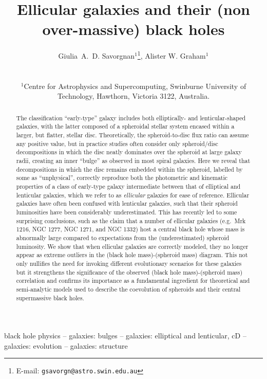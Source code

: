 \documentclass[useAMS,usenatbib,article]{mn2e}
\title[Ellicular galaxies]{Ellicular galaxies and their (non over-massive) black holes}
\author[G.~A.~D. Savorgnan \& A.~W. Graham]
{\parbox{\textwidth}{
Giulia~A.~D. Savorgnan$^{1}$\thanks{E-mail: \texttt{gsavorgn@astro.swin.edu.au}},
Alister W. Graham$^{1}$}\vspace{0.4cm}\\
\parbox{\textwidth}{
$^{1}$Centre for Astrophysics and Supercomputing, Swinburne University of Technology, Hawthorn, Victoria 3122, Australia.\\}}
\begin{document}
\maketitle

\label{firstpage}



\begin{abstract}
The classification ``early-type'' galaxy includes both elliptically- and lenticular-shaped galaxies, 
with the latter composed of a spheroidal stellar system encased within a larger, but flatter, stellar disc. 
Theoretically, the spheroid-to-disc flux ratio can assume any positive value,  
but in practice studies often consider only spheroid/disc decompositions 
in which the disc neatly dominates over the spheroid at large galaxy radii, 
creating an inner ``bulge'' as observed in most spiral galaxies. 
Here we reveal that decompositions in which the disc remains embedded within the spheroid, labelled by some as ``unphysical'',  
correctly reproduce both the photometric and kinematic properties of a class of early-type galaxy 
intermediate between that of elliptical and lenticular galaxies, which we refer to as \emph{ellicular} galaxies for ease of reference. 
Ellicular galaxies have often been confused with lenticular galaxies, 
such that %
their spheroid luminosities have been considerably underestimated. 
This has recently led to some surprising conclusions, 
such as the claim that a number of ellicular galaxies (e.g.~Mrk 1216, NGC 1277, NGC 1271, and NGC 1332) 
host a central black hole whose mass is abnormally large compared to expectations from the (underestimated) spheroid luminosity. 
We show that when ellicular galaxies are correctly modeled, 
they no longer appear as extreme outliers in the (black hole mass)-(spheroid mass) diagram. 
This not only nullifies the need for invoking different evolutionary scenarios for these galaxies 
but it strengthens the significance of the observed (black hole mass)-(spheroid mass) correlation 
and confirms its importance as a fundamental ingredient for theoretical and semi-analytic models 
used to describe the coevolution of spheroids and their central supermassive black holes. 

\end{abstract}

\begin{keywords}
black hole physics -- galaxies: bulges -- galaxies: elliptical and lenticular, cD -- galaxies: evolution -- galaxies: structure
\end{keywords}
\end{document}
